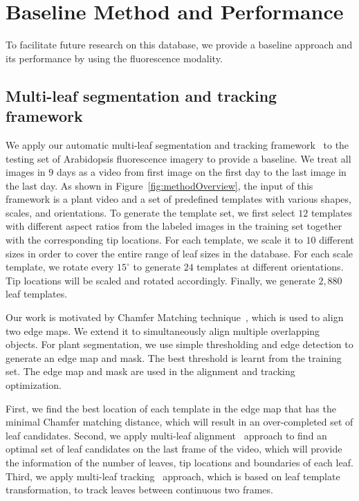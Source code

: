 \section{Baseline Method and Performance}
\label{sec:baseline}

To facilitate future research on this database, we provide a baseline approach and its performance by using the fluorescence modality.

\subsection{Multi-leaf segmentation and tracking framework}
We apply our automatic multi-leaf segmentation and tracking framework~\cite{yin2014a,yin2014b} to the testing set of Arabidopsis fluorescence imagery to provide a baseline.
We treat all images in $9$ days as a video from first image on the first day to the last image in the last day.
As shown in Figure~\ref{fig:methodOverview}, the input of this framework is a plant video and a set of predefined templates with various shapes, scales, and orientations.
To generate the template set, we first select $12$ templates with different aspect ratios from the labeled images in the training set together with the corresponding tip locations.
For each template, we scale it to $10$ different sizes in order to cover the entire range of leaf sizes in the database.
For each scale template, we rotate every $15^{\circ}$ to generate $24$ templates at different orientations.
Tip locations will be scaled and rotated accordingly.
Finally, we generate $2,880$ leaf templates.



Our work is motivated by Chamfer Matching technique~\cite{barrow1977parametric}, which is used to align two edge maps.
We extend it to simultaneously align multiple overlapping objects.
For plant segmentation, we use simple thresholding and edge detection to generate an edge map and mask.
The best threshold is learnt from the training set.
The edge map and mask are used in the alignment and tracking optimization.

First, we find the best location of each template in the edge map that has the minimal Chamfer matching distance, which will result in an over-completed set of leaf candidates.
Second, we apply multi-leaf alignment~\cite{yin2014a} approach to find an optimal set of leaf candidates on the last frame of the video, which will provide the information of the number of leaves, tip locations and boundaries of each leaf.
Third, we apply multi-leaf tracking~\cite{yin2014b} approach, which is based on leaf template transformation, to track leaves between continuous two frames.

